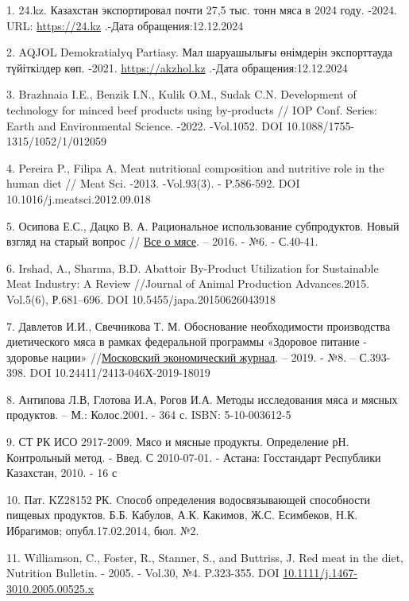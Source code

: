 \begin{references}
1. 24.kz. Казахстан экспортировал почти 27,5 тыс. тонн мяса в 2024 году.
-2024. URL:
\href{https://24.kz/ru/news/economyc/item/664590-kazakhstan-eksportiroval-pochti-27-5-tys-tonn-myasa-v-2024-godu}{https://24.kz}
.-Дата обращения:12.12.2024

2. AQJOL Demokratialyq Partiasy. Мал шаруашылығы өнімдерін экспорттауда
түйіткілдер көп. -2021.
\href{https://akzhol.kz/index.php/kk/initiated-bills/mal-sharwashylyghy-oenimderin-eksporttawda-tuejtkilder-koep}{https://akzhol.kz}
.-Дата обращения:12.12.2024

3. Brazhnaia I.E., Benzik I.N., Kulik O.M., Sudak C.N. Development of
technology for minced beef products using by-products // IOP Conf.
Series: Earth and Environmental Science. -2022. -Vol.1052. DOI
10.1088/1755-1315/1052/1/012059

4. Pereira P., Filipa A. Meat nutritional composition and nutritive role
in the human diet // Meat Sci. -2013. -Vol.93(3). - P.586-592. DOI
10.1016/j.meatsci.2012.09.018

5. Осипова Е.С., Дацко В. А. Рациональное использование субпродуктов.
Новый взгляд на старый вопрос //
\href{https://cyberleninka.ru/journal/n/vse-o-myase}{Все о мясе}. --
2016. - №6. - С.40-41.

6. Irshad, A., Sharma, B.D. Abattoir By-Product Utilization for
Sustainable Meat Industry: A Review //Journal of Animal Production
Advances.2015. Vol.5(6), Р.681--696. DOI
10.5455/japa.20150626043918

7. Давлетов И.И., Свечникова Т. М. Обоснование необходимости производства
диетического мяса в рамках федеральной программы «Здоровое питание -
здоровье нации»
//\href{https://cyberleninka.ru/journal/n/moskovskiy-ekonomicheskiy-zhurnal}{Московский
экономический журнал}. -- 2019. - №8. -- С.393-398. DOI
10.24411/2413-046Х-2019-18019

8. Антипова Л.В, Глотова И.А, Рогов И.А. Методы исследования мяса и
мясных продуктов. -- М.: Колос.2001. - 364 с. ISBN: 5-10-003612-5

9. СТ РК ИСО 2917-2009. Мясо и мясные продукты. Определение рН.
Контрольный метод. - Введ. С 2010-07-01. - Астана: Госстандарт
Республики Казахстан, 2010. - 16 с

10. Пат. KZ28152 РК. Cпособ определения водосвязывающей способности
пищевых продуктов. Б.Б. Кабулов, А.К. Какимов, Ж.С. Есимбеков, Н.К.
Ибрагимов; опубл.17.02.2014, бюл. №2.

11. Williamson, C., Foster, R., Stanner, S., and Buttriss, J. Red meat in
the diet, Nutrition Bulletin. - 2005. - Vol.30, №4. P.323-355.
DOI \href{http://dx.doi.org/10.1111/j.1467-3010.2005.00525.x}{10.1111/j.1467-3010.2005.00525.x}


\end{references}
